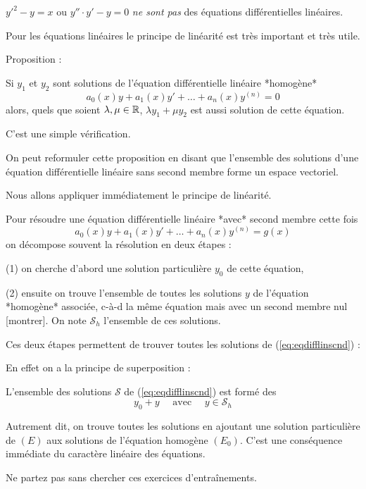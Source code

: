 \change
$y'^2 - y = x$ ou $y'' \cdot  y' - y = 0$ \emph{ne sont pas} des équations différentielles linéaires.  


\diapo


Pour les équations linéaires le principe de linéarité 
est très important et très utile.

Proposition :

Si $y_1$ et $y_2$ sont solutions de l'équation différentielle linéaire *homogène*
\begin{equation}
  a_0(x)y+a_1(x)y'+\dots +a_n(x)y^{(n)} = 0
  \label{eq:eqdifflin}
 \tag{$E_0$}
\end{equation}
alors, quels que soient $\lambda,\mu \in \mathbb{R}$, $\lambda y_1 + \mu y_2$ 
est aussi solution de cette équation.

C'est une simple vérification. 

On peut reformuler cette proposition 
en disant que l'ensemble des solutions
d'une équation différentielle linéaire sans second membre
forme un espace vectoriel.


\diapo

Nous allons appliquer immédiatement le principe de linéarité.

Pour résoudre une équation différentielle linéaire *avec* second membre  cette fois
\begin{equation}
  a_0(x)y+a_1(x)y'+\dots +a_n(x)y^{(n)} = g(x)
  \label{eq:eqdifflinscnd}
 \tag{$E$}
\end{equation}
\change
on décompose souvent la résolution en deux étapes :

(1) on cherche d'abord une solution particulière $y_0$ de cette équation,

\change
(2) ensuite on trouve l'ensemble de toutes les solutions 
$y$ de l'équation *homogène* associée, c-à-d la même équation mais 
avec un second membre nul [montrer].
On note $\mathcal{S}_h$ l'ensemble de ces solutions.

Ces deux étapes permettent de trouver toutes les solutions de (\ref{eq:eqdifflinscnd}) :

\change
En effet on a la principe de superposition :


L'ensemble des solutions $\mathcal{S}$ de (\ref{eq:eqdifflinscnd}) est formé 
des 
$$y_0 + y \quad \text{ avec } \quad  y \in \mathcal{S}_h$$


Autrement dit, on trouve toutes les solutions en ajoutant une solution particulière 
de $(E)$ aux solutions de l'équation homogène $(E_0)$.
C'est une conséquence immédiate du caractère linéaire des équations.

\diapo

Ne partez pas sans chercher ces exercices d’entraînements.




